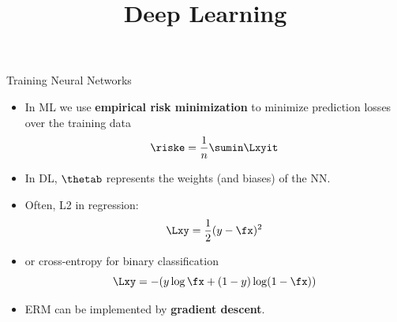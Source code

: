 




\newcommand{\titlefigure}{figure/loss_surface.png}
\newcommand{\learninggoals}{
  \item Empirical risk minimization
  \item Gradient descent
  \item Stochastic gradient descent
}

\title{Deep Learning}
\date{}




\begin{vbframe}{Training Neural Networks}


\begin{itemize}
\item
In ML we use \textbf{empirical risk minimization} to minimize prediction 
losses over the training data
$$\riske = \frac{1}{n} \sumin \Lxyit$$
\item In DL, $\thetab$ represents the weights (and biases) of the NN. 
\item Often, L2 in regression:
$$\Lxy = \frac{1}{2}(y - \fx)^2$$
\item or cross-entropy for binary classification
$$\Lxy = - (y \log \fx + (1 - y) \log(1 - \fx))$$
 \item ERM can be implemented by \textbf{gradient descent}.
\end{itemize}
\end{vbframe}

